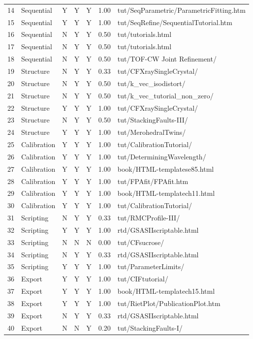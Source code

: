 \documentclass[12pt,a4paper]{article}
\begin{document}
\begin{longtable}{clcccc>{\raggedright\footnotesize\arraybackslash}p{5.8cm}}
  14 & Sequential  & Y & Y & Y & 1.00 & tut/SeqParametric/ParametricFitting.htm \\
  15 & Sequential  & Y & Y & Y & 1.00 & tut/SeqRefine/SequentialTutorial.htm \\
  16 & Sequential  & N & Y & Y & 0.50 & tut/tutorials.html \\
  17 & Sequential  & N & Y & Y & 0.50 & tut/tutorials.html \\
  18 & Sequential  & N & Y & Y & 0.50 & tut/TOF-CW Joint Refinement/ \\
  19 & Structure   & N & Y & Y & 0.33 & tut/CFXraySingleCrystal/ \\
  20 & Structure   & N & Y & Y & 0.50 & tut/k\_vec\_isodistort/ \\
  21 & Structure   & N & Y & Y & 0.50 & tut/k\_vec\_tutorial\_non\_zero/ \\
  22 & Structure   & Y & Y & Y & 1.00 & tut/CFXraySingleCrystal/ \\
  23 & Structure   & N & Y & Y & 0.50 & tut/StackingFaults-III/ \\
  24 & Structure   & Y & Y & Y & 1.00 & tut/MerohedralTwins/ \\
  25 & Calibration & Y & Y & Y & 1.00 & tut/CalibrationTutorial/ \\
  26 & Calibration & Y & Y & Y & 1.00 & tut/DeterminingWavelength/ \\
  27 & Calibration & Y & Y & Y & 1.00 & book/HTML-templatese85.html \\
  28 & Calibration & Y & Y & Y & 1.00 & tut/FPAfit/FPAfit.htm \\
  29 & Calibration & Y & Y & Y & 1.00 & book/HTML-templatech11.html \\
  30 & Calibration & Y & Y & Y & 1.00 & tut/CalibrationTutorial/ \\
  31 & Scripting   & N & Y & Y & 0.33 & tut/RMCProfile-III/ \\
  32 & Scripting   & Y & Y & Y & 1.00 & rtd/GSASIIscriptable.html \\
  33 & Scripting   & N & N & N & 0.00 & tut/CFsucrose/ \\
  34 & Scripting   & N & Y & Y & 0.33 & rtd/GSASIIscriptable.html \\
  35 & Scripting   & Y & Y & Y & 1.00 & tut/ParameterLimits/ \\
  36 & Export      & Y & Y & Y & 1.00 & tut/CIFtutorial/ \\
  37 & Export      & Y & Y & Y & 1.00 & book/HTML-templatech15.html \\
  38 & Export      & Y & Y & Y & 1.00 & tut/RietPlot/PublicationPlot.htm \\
  39 & Export      & N & Y & Y & 0.33 & rtd/GSASIIscriptable.html \\
  40 & Export      & N & N & Y & 0.20 & tut/StackingFaults-I/ \\
\end{longtable}
\end{document}
